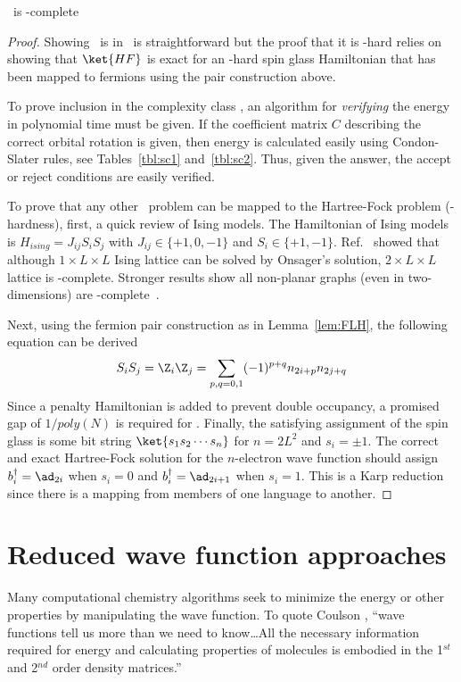 \documentclass[11pt,oneside,final]{huthesis}%
\begin{document}
\begin{theorem}\label{thm:HF} \HF~is \np-complete~\cite{Schuch09}\end{theorem}
	\begin{proof} Showing \HF~is in \np~is straightforward but the proof that it is \np-hard relies on showing that $\ket{HF}$ is exact for an \np-hard spin glass Hamiltonian that has been mapped to fermions using the pair construction above.  
		
To prove inclusion in the complexity class \np, an algorithm for \emph{verifying} the energy in polynomial time must be given.  If the coefficient matrix $C$ describing the correct orbital rotation is given, then energy is calculated easily using Condon-Slater rules, see Tables~\ref{tbl:sc1} and~\ref{tbl:sc2}. Thus, given the answer, the accept or reject conditions are easily verified.  

To prove that any other \np~problem can be mapped to the Hartree-Fock problem (\np-hardness), first, a quick review of Ising models. The Hamiltonian of Ising models is $H_{ising}=J_{ij}S_iS_j$ with $J_{ij}\in\{+1,0,-1\}$ and $S_i\in\{+1,-1\}$. Ref.~\cite{Barahona82} showed that although $1\times L\times L$ Ising lattice can be solved by Onsager's solution, $2\times L\times L$ lattice is \np-complete. Stronger results show all non-planar graphs (even in two-dimensions) are \np-complete~\cite{Istrail00}.

Next, using the fermion pair construction as in Lemma~\ref{lem:FLH}, the following equation can be derived $$S_iS_j=\Z_i \Z_j=\sum_{p,q=0,1}(-1)^{p+q}n_{2i+p}n_{2j+q}$$ Since a penalty Hamiltonian is added to prevent double occupancy, a promised gap of $1/poly(N)$ is required for \HF.  Finally, the satisfying assignment of the spin glass is some bit string $\ket{s_1s_2\cdots s_n}$ for $n=2L^2$ and $s_i=\pm 1$. The correct and exact Hartree-Fock solution for the $n$-electron wave function should assign $b^\dagger_i=\ad_{2i}$ when $s_i=0$ and $b^\dagger_i=\ad_{2i+1}$ when $s_i=1$.  This is a Karp reduction since there is a mapping from members of one language to another.
\end{proof}

\section{Reduced wave function approaches}
Many computational chemistry algorithms seek to minimize the energy or other properties by manipulating the wave function. To quote Coulson \cite{Coulson60}, ``wave functions tell us more than we need to know\ldots All the necessary information required for energy and calculating properties of molecules is embodied in the 1$^{st}$ and 2$^{nd}$ order density matrices.'' 
\end{document}
